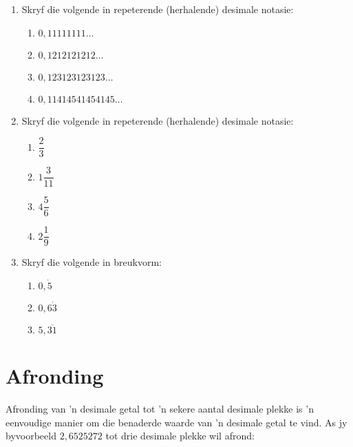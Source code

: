 \begin{exercises}{}
{\begin{enumerate}[itemsep=5pt, label=\textbf{\arabic*}. ]
\item Skryf die volgende in repeterende (herhalende) desimale notasie:
    \begin{enumerate}[itemsep=5pt, label=\textbf{\alph*}. ] 
    \item $0,11111111\ldots$
    \item $0,1212121212\ldots$
    \item $0,123123123123\ldots$
    \item $0,11414541454145\ldots$
    \end{enumerate}
\item Skryf die volgende in repeterende (herhalende) desimale notasie:
    \begin{enumerate}[itemsep=5pt, label=\textbf{\alph*}. ] 
    \item $\dfrac{2}{3}$
    \item $1\dfrac{3}{11}$
    \item $4\dfrac{5}{6}$
    \item $2\dfrac{1}{9}$
    \end{enumerate}
\item Skryf die volgende in breukvorm:
    \begin{enumerate}[itemsep=5pt, label=\textbf{\alph*}. ] 
    \item $0,\dot{5}$
    \item $0,6\dot{3}$
    \item $5,\overline{31}$
    \end{enumerate}
\end{enumerate}

}
\end{exercises}

\section{Afronding}

Afronding van ’n desimale getal tot ’n sekere aantal desimale plekke is ’n eenvoudige manier om die benaderde waarde van ’n desimale getal te vind. As jy byvoorbeeld $2,6525272$  tot drie desimale plekke wil afrond:

